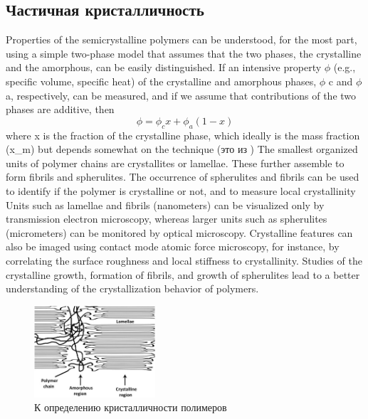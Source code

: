 \subsection{Частичная кристалличность}
Properties of the semicrystalline polymers can be understood, for the most part,
using a simple two-phase model that assumes that the two phases, the crystalline and
the amorphous, can be easily distinguished. If an intensive property $\phi$ (e.g., specific
volume, specific heat) of the crystalline and amorphous phases, $\phi$ c and $\phi$a, respectively, can be measured, and if we assume that contributions of the two phases
are additive, then
\[ 
\phi = \phi_c x + \phi_a(1-x)
\]
where x is the fraction of the crystalline phase, which ideally is the mass fraction
(x\_m) but depends somewhat on the technique (это из \cite{cryst3})
The
smallest organized units of polymer chains are crystallites or lamellae. These further
assemble to form fibrils and spherulites. The occurrence of spherulites and fibrils can
be used to identify if the polymer is crystalline or not, and to measure local crystallinity\\
Units such as lamellae and fibrils (nanometers) can be visualized only by
transmission electron microscopy, whereas larger units such as spherulites (micrometers)
can be monitored by optical microscopy. Crystalline features can also be
imaged using contact mode atomic force microscopy, for instance, by correlating
the surface roughness and local stiffness to crystallinity. Studies of the crystalline
growth, formation of fibrils, and growth of spherulites lead to a better understanding
of the crystallization behavior of polymers.
	
	\begin{figure} 
\vspace{-20pt}
  \begin{center}
    \includegraphics[width=0.4\textwidth]{fig/crystal-2.jpg}
    \caption{К определению кристалличности полимеров}
    \label{fig:crystal-2}
  \end{center}
  \vspace{-20pt}
  \vspace{1pt}
\end{figure}	

